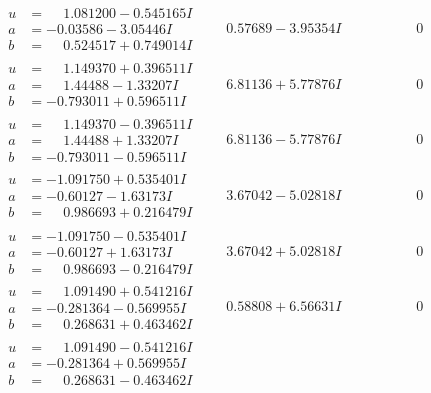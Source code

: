 \documentclass[1p]{elsarticle_modified}
\theoremstyle{definition}
\begin{document}
$$\begin{array}{c|c|c}
\begin{aligned}
u &= \phantom{-}1.081200 - 0.545165 I \\
a &= -0.03586 - 3.05446 I \\
b &= \phantom{-}0.524517 + 0.749014 I\end{aligned}
 & \phantom{-}0.57689 - 3.95354 I & \phantom{-0.000000 } 0 \\ \hline\begin{aligned}
u &= \phantom{-}1.149370 + 0.396511 I \\
a &= \phantom{-}1.44488 - 1.33207 I \\
b &= -0.793011 + 0.596511 I\end{aligned}
 & \phantom{-}6.81136 + 5.77876 I & \phantom{-0.000000 } 0 \\ \hline\begin{aligned}
u &= \phantom{-}1.149370 - 0.396511 I \\
a &= \phantom{-}1.44488 + 1.33207 I \\
b &= -0.793011 - 0.596511 I\end{aligned}
 & \phantom{-}6.81136 - 5.77876 I & \phantom{-0.000000 } 0 \\ \hline\begin{aligned}
u &= -1.091750 + 0.535401 I \\
a &= -0.60127 - 1.63173 I \\
b &= \phantom{-}0.986693 + 0.216479 I\end{aligned}
 & \phantom{-}3.67042 - 5.02818 I & \phantom{-0.000000 } 0 \\ \hline\begin{aligned}
u &= -1.091750 - 0.535401 I \\
a &= -0.60127 + 1.63173 I \\
b &= \phantom{-}0.986693 - 0.216479 I\end{aligned}
 & \phantom{-}3.67042 + 5.02818 I & \phantom{-0.000000 } 0 \\ \hline\begin{aligned}
u &= \phantom{-}1.091490 + 0.541216 I \\
a &= -0.281364 - 0.569955 I \\
b &= \phantom{-}0.268631 + 0.463462 I\end{aligned}
 & \phantom{-}0.58808 + 6.56631 I & \phantom{-0.000000 } 0 \\ \hline\begin{aligned}
u &= \phantom{-}1.091490 - 0.541216 I \\
a &= -0.281364 + 0.569955 I \\
b &= \phantom{-}0.268631 - 0.463462 I\end{aligned}

\end{array}$$
\end{document}
